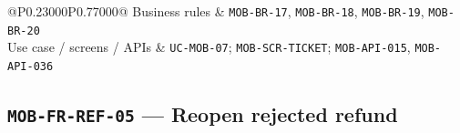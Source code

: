\begin{longtable}{@{}P{0.23000\SRSWidth}P{0.77000\SRSWidth}@{}}
Business rules & \texttt{MOB-\allowbreak{}BR-\allowbreak{}17}, \texttt{MOB-\allowbreak{}BR-\allowbreak{}18}, \texttt{MOB-\allowbreak{}BR-\allowbreak{}19}, \texttt{MOB-\allowbreak{}BR-\allowbreak{}20} \\[3pt]
Use case /\allowbreak{} screens /\allowbreak{} APIs & \texttt{UC-\allowbreak{}MOB-\allowbreak{}07}; \texttt{MOB-\allowbreak{}SCR-\allowbreak{}TICKET}; \texttt{MOB-\allowbreak{}API-\allowbreak{}015}, \texttt{MOB-\allowbreak{}API-\allowbreak{}036} \\[3pt]
\end{longtable}
\endgroup

\subsection{\texttt{MOB-\allowbreak{}FR-\allowbreak{}REF-\allowbreak{}05} — Reopen rejected refund}
\begingroup
\fontsize{9.5}{12}\selectfont
\setlength{\SRSWidth}{\dimexpr\linewidth-2\tabcolsep\relax}

